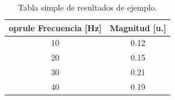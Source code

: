 \begin{table}[!t]               %
  \centering                    %
  \caption{Tabla simple de resultados de ejemplo.}\label{tab:resultados} %
  \begin{tabular}{c c}          %
    	oprule                    %
    Frecuencia [Hz] & Magnitud [u.] \\
  \midrule                    %
    10 & 0.12 \\
    20 & 0.15 \\
    30 & 0.21 \\
    40 & 0.19 \\
  \bottomrule                 %
  \end{tabular}
\end{table}
